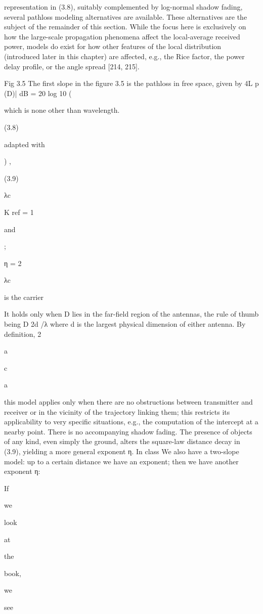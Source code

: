 {{{representation in (3.8), suitably complemented by log-normal shadow fading, several pathloss modeling alternatives are available. These alternatives are the subject of the remainder of this section. While the focus here is exclusively on how the large-scale propagation phenomena affect the local-average received power, models do exist for how other features of the local distribution (introduced later in this chapter) are affected, e.g., the Rice factor, the power delay profile, or the angle spread [214,
215].

Fig 3.5 The first slope in the figure 3.5 is the pathloss in free space, given by 4\piD L p (D)| dB = 20 log 10 (

which is none other than wavelength.

(3.8)

adapted with

) ,

(3.9)

λc

K ref = 1

and

;

η = 2

λc

is the carrier

It holds only when D lies in the far-field region of the antennas, the rule of thumb being D \geq 2d /λ where d is the largest physical dimension of either antenna. By definition,
2

a

c

a

this model applies only when there are no obstructions between transmitter and receiver or in the vicinity of the trajectory linking them; this restricts its applicability to very specific situations, e.g., the computation of the intercept at a nearby point. There is no accompanying shadow fading. The presence of objects of any kind, even simply the ground, alters the square-law distance decay in (3.9), yielding a more general exponent η.
In class We also have a two-slope model: up to a certain distance we have an exponent; then we have another exponent η:

If

we

look

at

the

book,

we

see

}}}
